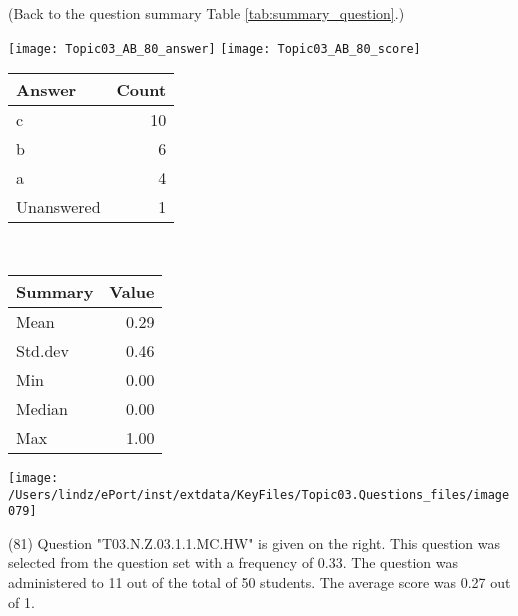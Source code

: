\documentclass[12pt,english,nohyper]{tufte-handout}\usepackage[]{graphicx}\usepackage[]{color}
\begin{document}
 (Back to the question summary Table \ref{tab:summary_question}.)

\begin{center} \texttt{[image: Topic03\_AB\_80\_answer]} \texttt{[image: Topic03\_AB\_80\_score]} \end{center} 

\begin{center}%
\begin{tabular}{lr}
  \hline
Answer & Count \\ 
  \hline
c &  10 \\ 
  b &   6 \\ 
  a &   4 \\ 
  Unanswered &   1 \\ 
   \hline
\end{tabular}
~~~~~~~~%
\begin{tabular}{lr}
  \hline
Summary & Value \\ 
  \hline
Mean & 0.29 \\ 
  Std.dev & 0.46 \\ 
  Min & 0.00 \\ 
  Median & 0.00 \\ 
  Max & 1.00 \\ 
   \hline
\end{tabular}
\end{center}\newpage{}



\vspace{5cm}\begin{marginfigure}\texttt{[image: /Users/lindz/ePort/inst/extdata/KeyFiles/Topic03.Questions\_files/image079]}\end{marginfigure}\vspace{-5cm} (81) Question "T03.N.Z.03.1.1.MC.HW" is given on the right. This question was selected from the question set with a frequency of 0.33. The question was administered to 11 out of the total of 50 students. The average score was 0.27 out of 1.
\end{document}
